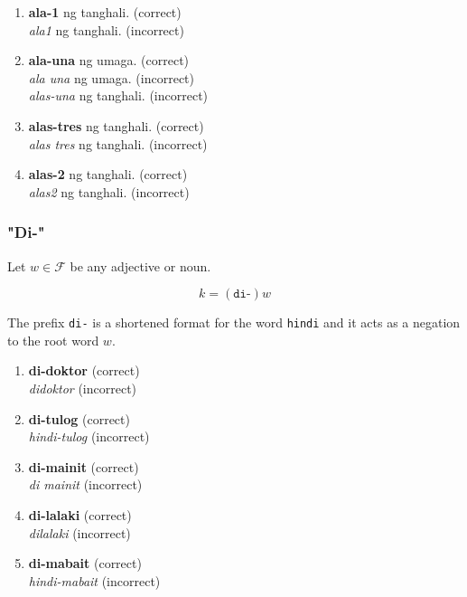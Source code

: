 \begin{example}
\end{example}
\begin{enumerate}
      \item \textbf{ala-1} ng tanghali. (correct) \\
            \textit{ala1} ng tanghali. (incorrect)
      \item \textbf{ala-una} ng umaga. (correct) \\
            \textit{ala una} ng umaga. (incorrect) \\
            \textit{alas-una} ng tanghali. (incorrect)
      \item \textbf{alas-tres} ng tanghali. (correct) \\
            \textit{alas tres} ng tanghali. (incorrect)
      \item \textbf{alas-2} ng tanghali. (correct) \\
            \textit{alas2} ng tanghali. (incorrect)
\end{enumerate}

\subsubsection{"Di-"}

Let $w\in\mathcal{F}$ be any adjective or noun.

\[
      k = (\texttt{di-})w
\]

The prefix \texttt{di-} is a shortened format for the word \texttt{hindi} and it acts as a negation to the root word $w$.

\begin{example}
\end{example}
\begin{enumerate}
      \item \textbf{di-doktor} (correct) \\
            \textit{didoktor} (incorrect)
      \item \textbf{di-tulog} (correct) \\
            \textit{hindi-tulog} (incorrect)
      \item \textbf{di-mainit} (correct) \\
            \textit{di mainit} (incorrect)
      \item \textbf{di-lalaki} (correct) \\
            \textit{dilalaki} (incorrect)
      \item \textbf{di-mabait} (correct) \\
            \textit{hindi-mabait} (incorrect)
\end{enumerate}

